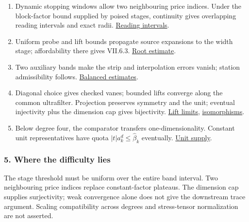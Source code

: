 \documentclass[
  letterpaper,
  11pt]{article}
\providecommand{\tightlist}{%
  \setlength{\itemsep}{0pt}\setlength{\parskip}{0pt}}
\begin{document}
\begin{enumerate}
\def\labelenumi{\arabic{enumi}.}
\tightlist
\item
  Dynamic stopping windows allow two neighbouring price indices. Under
  the block-factor bound supplied by poised stages, continuity gives
  overlapping reading intervals and exact radii.
  \href{https://github.com/yang-mills-group/OpenAI-YM-20261028/blob/3456e5e75cf8d4cd558955a5c7638fba2d68f464/YM/TraceExtension/Prom/Orion/Ramp.lean\#L32-L43}{Reading
  intervals}.
\item
  Uniform probe and lift bounds propagate source expansions to the width
  stage; affordability there gives VII.6.3.
  \href{https://github.com/yang-mills-group/OpenAI-YM-20261028/blob/3456e5e75cf8d4cd558955a5c7638fba2d68f464/YM/TraceExtension/Prom/Port/Soft/Denarii.lean\#L31-L62}{Root
  estimate}.
\item
  Two auxiliary bands make the strip and interpolation errors vanish;
  station admissibility follows.
  \href{https://github.com/yang-mills-group/OpenAI-YM-20261028/blob/3456e5e75cf8d4cd558955a5c7638fba2d68f464/YM/TraceExtension/Prom/Orion/Medal.lean\#L39-L90}{Balanced
  estimates}.
\item
  Diagonal choice gives checked vanes; bounded lifts converge along the
  common ultrafilter. Projection preserves symmetry and the unit;
  eventual injectivity plus the dimension cap gives bijectivity.
  \href{https://github.com/yang-mills-group/OpenAI-YM-20261028/blob/3456e5e75cf8d4cd558955a5c7638fba2d68f464/YM/TraceExtension/Prom/Zoom/Pepper.lean\#L11-L60}{Lift
  limits},
  \href{https://github.com/yang-mills-group/OpenAI-YM-20261028/blob/3456e5e75cf8d4cd558955a5c7638fba2d68f464/YM/TraceExtension/Prom/Zoom/Mast.lean\#L32-L58}{isomorphisms}.
\item
  Below degree four, the comparator transfers one-dimensionality.
  Constant unit representatives have quota \(|t|a_k^d\le\hat\beta_k\)
  eventually.
  \href{https://github.com/yang-mills-group/OpenAI-YM-20261028/blob/3456e5e75cf8d4cd558955a5c7638fba2d68f464/YM/SharpGram/Clauses.lean\#L54-L61}{Unit
  supply}.
\end{enumerate}

\subsubsection{5. Where the difficulty
lies}\label{where-the-difficulty-lies-30}

The stage threshold must be uniform over the entire band interval. Two
neighbouring price indices replace constant-factor plateaus. The
dimension cap supplies surjectivity; weak convergence alone does not
give the downstream trace argument. Scaling compatibility across degrees
and stress-tensor normalization are not asserted.
\end{document}

